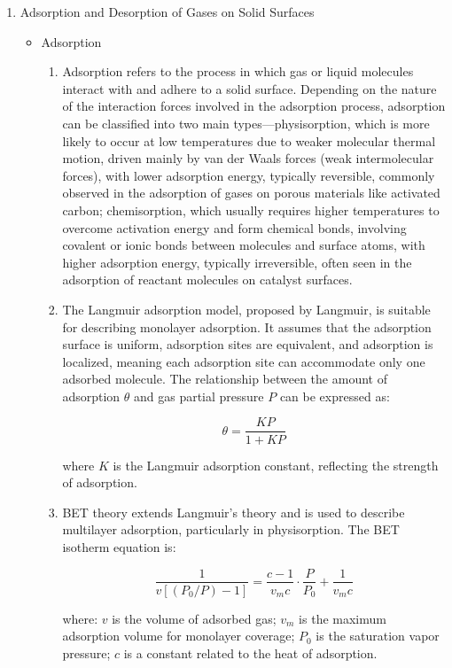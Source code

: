 \begin{enumerate}
\begin{enumerate}
		\item Adsorption and Desorption of Gases on Solid Surfaces
		\begin{itemize}
			\item Adsorption
			\begin{enumerate}
				\item Adsorption refers to the process in which gas or liquid molecules interact with and adhere to a solid surface. Depending on the nature of the interaction forces involved in the adsorption process, adsorption can be classified into two main types—physisorption, which is more likely to occur at low temperatures due to weaker molecular thermal motion, driven mainly by van der Waals forces (weak intermolecular forces), with lower adsorption energy, typically reversible, commonly observed in the adsorption of gases on porous materials like activated carbon; chemisorption, which usually requires higher temperatures to overcome activation energy and form chemical bonds, involving covalent or ionic bonds between molecules and surface atoms, with higher adsorption energy, typically irreversible, often seen in the adsorption of reactant molecules on catalyst surfaces.
				
				\item The Langmuir adsorption model, proposed by Langmuir, is suitable for describing monolayer adsorption. It assumes that the adsorption surface is uniform, adsorption sites are equivalent, and adsorption is localized, meaning each adsorption site can accommodate only one adsorbed molecule. The relationship between the amount of adsorption \( \theta \) and gas partial pressure \( P \) can be expressed as:
				
				\[
				\theta = \frac{KP}{1 + KP}
				\]
				
				where \( K \) is the Langmuir adsorption constant, reflecting the strength of adsorption.
				
				\item BET theory extends Langmuir's theory and is used to describe multilayer adsorption, particularly in physisorption. The BET isotherm equation is:
				
				\[
				\frac{1}{v[(P_0/P) - 1]} = \frac{c - 1}{v_m c} \cdot \frac{P}{P_0} + \frac{1}{v_m c}
				\]
				
				where: \( v \) is the volume of adsorbed gas; \( v_m \) is the maximum adsorption volume for monolayer coverage; \( P_0 \) is the saturation vapor pressure; \( c \) is a constant related to the heat of adsorption.
				

\end{enumerate}
\end{itemize}
\end{enumerate}
\end{enumerate}
